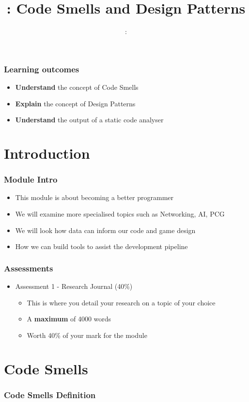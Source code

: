 \usepackage{../../beamerthemeFalmouthGamesAcademy}
\usepackage{multimedia}
\graphicspath{ {../../} }


\usepackage[normalem]{ulem}
\usepackage{wasysym}

\usepackage{pdfpages}

\usetikzlibrary{arrows,automata}




\title{\sessionnumber: Code Smells and Design Patterns}
\subtitle{\modulecode: \moduletitle}

\frame{\titlepage} 

\begin{frame}
	\frametitle{Learning outcomes}
	\begin{itemize}
		\item \textbf{Understand} the concept of Code Smells
		\item \textbf{Explain} the concept of Design Patterns
		\item \textbf{Understand} the output of a static code analyser
	\end{itemize}
\end{frame}

\section{Introduction}

\begin{frame}
	\frametitle{Module Intro}
	\begin{itemize}
		\item This module is about becoming a better programmer
		\item We will examine more specialised topics such as Networking, AI, PCG
		\item We will look how data can inform our code and game design
		\item How we can build tools to assist the development pipeline
	\end{itemize}
\end{frame}

\begin{frame}
	\frametitle{Assessments}
	\begin{itemize}
		\item Assessment 1 - Research Journal (40\%)
		\begin{itemize}
			\item This is where you detail your research on a topic of your choice
			\item A \textbf{maximum} of 4000 words
			\item Worth 40\% of your mark for the module
		\end{itemize}
	\end{itemize}
\end{frame}

\section{Code Smells}

\begin{frame}
\frametitle{Code Smells Definition}
\end{frame}


